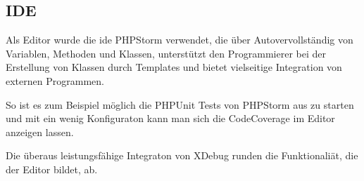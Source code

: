 \subsection{IDE}
Als Editor wurde die \gls{ide} PHPStorm verwendet, die über Autovervollständig von Variablen, Methoden und Klassen, unterstützt den Programmierer bei der Erstellung von Klassen durch Templates und bietet vielseitige Integration von externen Programmen.

So ist es zum Beispiel möglich die PHPUnit Tests von PHPStorm aus zu starten und mit ein wenig Konfiguraton\cite{web:kowalke14} kann man sich die CodeCoverage im Editor anzeigen lassen.

Die überaus leistungsfähige Integraton von XDebug runden die Funktionaliät, die der Editor bildet, ab.
